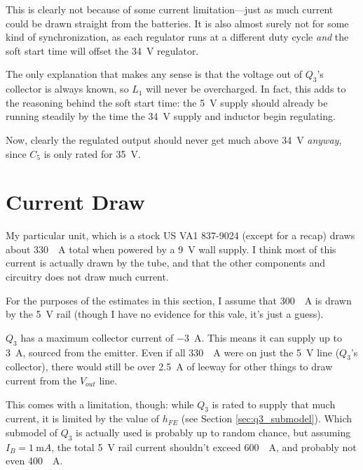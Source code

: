 \documentclass{article}
\newcommand{\Vout}{$V_{out}$}
\newcommand{\model}{\textsf}
\begin{document}
This is clearly not because of some current limitation---just as much
current could be drawn straight from the batteries. It is also almost
surely not for some kind of synchronization, as each regulator runs at
a different duty cycle \textit{and} the soft start time will offset
the \qty{34}{\volt} regulator.

The only explanation that makes any sense is that the voltage out of
$Q_3$'s collector is always known, so $L_1$ will never be
overcharged. In fact, this adds to the reasoning behind the soft
start time: the \qty{5}{\volt} supply should already be running
steadily by the time the \qty{34}{\volt} supply and inductor begin
regulating.

Now, clearly the regulated output should never get much above
\qty{34}{\volt} \textit{anyway}, since $C_5$ is only rated for
\qty{35}{\volt}.
\section{Current Draw}
\label{sec:current_draw}
My particular unit, which is a stock \model{US VA1 837-9024} (except
for a recap) draws about \qty{330}{\milli{}A} total when powered by a
\qty{9}{\volt} wall supply. I think most of this current is actually
drawn by the tube, and that the other components and circuitry does
not draw much current.

For the purposes of the estimates in this section, I assume that
\qty{300}{\milli{}A} is drawn by the \qty{5}{\volt} rail (though I
have no evidence for this vale, it's just a guess).

$Q_3$ has a maximum collector current of \qty{-3}{A}. This means it
can supply up to \qty{3}{A}, sourced from the emitter. Even if all
\qty{330}{\milli{}A} were on just the \qty{5}{\volt} line ($Q_3$'s
collector), there would still be over \qty{2.5}{A} of leeway for other
things to draw current from the \Vout{} line.

This comes with a limitation, though: while $Q_3$ is rated to supply
that much current, it is limited by the value of $h_{FE}$ (see Section
\ref{sec:q3_submodel}). Which submodel of $Q_3$ is actually used is
probably up to random chance, but assuming $I_B = \qty{1}{\milli{}A}$,
the total \qty{5}{\volt} rail current shouldn't exceed
\qty{600}{\milli{}A}, and probably not even \qty{400}{\milli{}A}.
\end{document}
